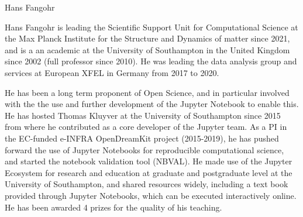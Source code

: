 \begin{participant}[type=leadPI,PM=5,gender=male]{Hans Fangohr}







  \medskip Hans Fangohr is leading the Scientific Support Unit for Computational
  Science at the Max Planck Institute for the Structure and Dynamics of matter
  since 2021, and is a an academic at the University of Southampton in the United Kingdom
  since 2002 (full professor since 2010). He was leading the data analysis group
  and services at European XFEL in Germany from 2017 to 2020.

  He has been a long term proponent of Open Science, and in particular involved
  with the the use and further development of the Jupyter Notebook to enable
  this. He has hosted Thomas Kluyver at the University of Southampton since 2015
  from where he contributed as a core developer of the Jupyter team. As a PI in
  the EC-funded e-INFRA OpenDreamKit project (2015-2019), he has pushed forward
  the use of Jupyter Notebooks for reproducible computational science, and
  started the notebook validation tool (NBVAL). He made use of the Jupyter
  Ecosystem for research and education at graduate and postgraduate level at the
  University of Southampton, and shared resources widely, including a text book
  provided through Jupyter Notebooks, which can be executed interactively
  online. He has been awarded 4 prizes for the quality of his teaching.


\end{participant}
